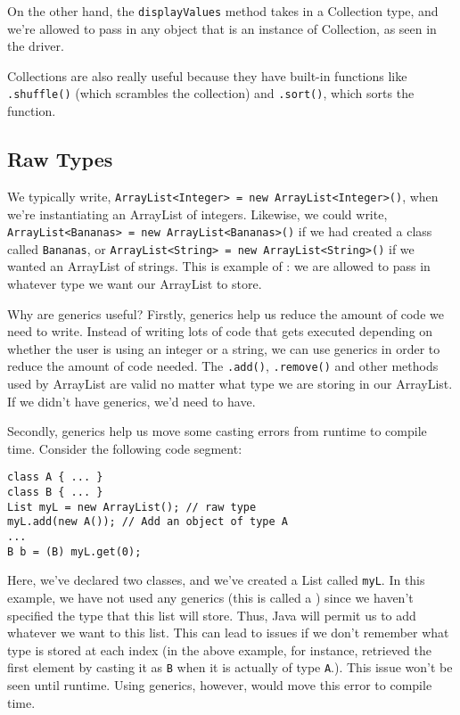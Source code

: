 On the other hand, the \verb!displayValues! method takes in a Collection type, and we're allowed to pass in any object that is an instance of Collection, as seen in the driver. 


Collections are also really useful because they have built-in functions like \verb!.shuffle()! (which scrambles the collection) and \verb!.sort()!, which sorts the function. 

\subsection{Raw Types}

We typically write, \verb!ArrayList<Integer> = new ArrayList<Integer>()!, when we're instantiating an ArrayList of integers. Likewise, we could write, \verb!ArrayList<Bananas> = new ArrayList<Bananas>()! if we had created a class called \verb!Bananas!, or \verb!ArrayList<String> = new ArrayList<String>()! if we wanted an ArrayList of strings. This is example of : we are allowed to pass in whatever type we want our ArrayList to store. 


Why are generics useful? Firstly, generics help us reduce the amount of code we need to write. Instead of writing lots of code that gets executed depending on whether the user is using an integer or a string, we can use generics in order to reduce the amount of code needed. The \verb!.add()!, \verb!.remove()! and other methods used by ArrayList are valid no matter what type we are storing in our ArrayList. If we didn't have generics, we'd need to have.

Secondly, generics help us move some casting errors from runtime to compile time. Consider the following code segment:

\begin{lstlisting}
class A { ... }
class B { ... }
List myL = new ArrayList(); // raw type
myL.add(new A()); // Add an object of type A
...
B b = (B) myL.get(0);
\end{lstlisting}

Here, we've declared two classes, and we've created a List called \verb!myL!. In this example, we have not used any generics (this is called a ) since we haven't specified the type that this list will store. Thus, Java will permit us to add whatever we want to this list. This can lead to issues if we don't remember what type is stored at each index (in the above example, for instance, retrieved the first element by casting it as \verb!B! when it is actually of type \verb!A!.). This issue won't be seen until runtime. Using generics, however, would move this error to compile time.


